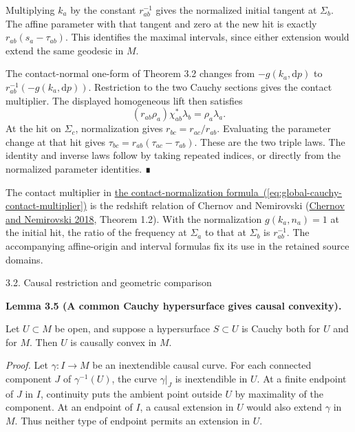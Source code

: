 \documentclass[
  english,
  11pt,
  reqno]{amsart}
\makeatletter
\newcommand{\paperstatementsection}{\@startsection{subsection}{2}%
  \z@{.5\linespacing\@plus.7\linespacing}{.35\baselineskip}%
  {\normalfont\bfseries}}
\newcommand{\paperfirststatement}[1]{%
  {\normalfont\bfseries #1\par}%
  \nobreak\@afterindenttrue\@afterheading}
\makeatother
\begin{document}
Multiplying \(k_a\) by the constant \(r_{ab}^{-1}\) gives the normalized
initial tangent at \(\Sigma_b\). The affine parameter with that tangent
and zero at the new hit is exactly \(r_{ab}(s_a-\tau_{ab})\). This
identifies the maximal intervals, since either extension would extend
the same geodesic in \(M\).

The contact-normal one-form of Theorem 3.2 changes from
\(-g(k_a,\mathrm dp)\) to \(r_{ab}^{-1}(-g(k_a,\mathrm dp))\).
Restriction to the two Cauchy sections gives the contact multiplier. The
displayed homogeneous lift then satisfies \[
(r_{ab}\rho_a)\chi_{ab}^*\lambda_b
=\rho_a\lambda_a.
\] At the hit on \(\Sigma_c\), normalization gives
\(r_{bc}=r_{ac}/r_{ab}\). Evaluating the parameter change at that hit
gives \(\tau_{bc}=r_{ab}(\tau_{ac}-\tau_{ab})\). These are the two
triple laws. The identity and inverse laws follow by taking repeated
indices, or directly from the normalized parameter identities. ∎

The contact multiplier in
\hyperref[eq:global-cauchy-contact-multiplier]{the contact-normalization
formula~(\ref*{eq:global-cauchy-contact-multiplier})} is the redshift relation of Chernov and Nemirovski
(\hyperref[ref-ChernovNemirovski2018]{Chernov and Nemirovski 2018},
Theorem 1.2). With the normalization \(g(k_a,n_a)=1\) at the initial
hit, the ratio of the frequency at \(\Sigma_a\) to that at \(\Sigma_b\)
is \(r_{ab}^{-1}\). The accompanying affine-origin and interval formulas
fix its use in the retained source domains.

\protect{}\label{sec:causal-restriction-and-geometric-comparison}
\paperstatementsection{3.2. Causal restriction and geometric
comparison}\label{causal-restriction-and-geometric-comparison}
\paperfirststatement{\protect{}\label{lem:common-cauchy-causal-convexity}Lemma 3.5 (A common Cauchy hypersurface gives causal convexity).}

Let \(U\subset M\) be open, and suppose a hypersurface \(S\subset U\) is
Cauchy both for \(U\) and for \(M\). Then \(U\) is causally convex in
\(M\).

\emph{Proof.} Let \(\gamma:I\to M\) be an inextendible causal curve. For
each connected component \(J\) of \(\gamma^{-1}(U)\), the curve
\(\gamma|_J\) is inextendible in \(U\). At a finite endpoint of \(J\) in
\(I\), continuity puts the ambient point outside \(U\) by maximality of
the component. At an endpoint of \(I\), a causal extension in \(U\)
would also extend \(\gamma\) in \(M\). Thus neither type of endpoint
permits an extension in \(U\).
\end{document}
